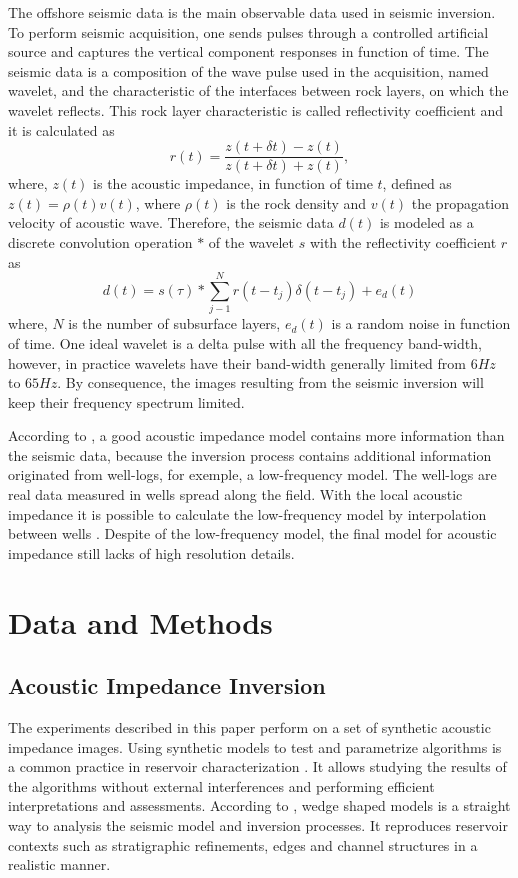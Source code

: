 \documentclass[conference,compsoc]{IEEEtran}
\begin{document}
The offshore seismic data is the main observable data used in seismic inversion. To perform seismic acquisition,
one sends pulses through a controlled artificial source and captures
the vertical component responses in function of time. The seismic data is a composition of
the wave pulse used in the acquisition, named wavelet, and the characteristic of the interfaces between rock layers,
on which the wavelet reflects. This rock layer characteristic is called reflectivity coefficient and it is
calculated as
\begin{equation}
r(t) = \frac{z(t+\delta t)-z(t)}{z(t+\delta t)+z(t)},
\label{eq:refletv}
\end{equation}
where, $z(t)$ is the acoustic impedance, in function of time $t$, defined as 
$z(t)=\rho(t)v(t)$, where $\rho(t)$ is the rock density and $v(t)$ the propagation velocity
of acoustic wave.
Therefore, the seismic data  $d(t)$ is modeled as a discrete convolution operation $*$ of the wavelet $s$ with the
reflectivity coefficient $r$ as
\begin{equation}
d(t) = s(\tau) * \sum_{j-1}^{N}{r(t- t_j) \delta(t - t_j) + e_d(t)}
\end{equation}
where, $N$ is the number of subsurface layers, $e_d(t)$ is a random noise in function of time.
One ideal wavelet is a delta pulse with all the frequency band-width, however, in practice
wavelets have their band-width generally limited from $6Hz$ to $65Hz$. By consequence,
the images resulting from the seismic inversion will keep their frequency spectrum limited.

According to \cite{Latimer}, a good acoustic impedance model contains more information
than the seismic data, because the inversion process contains additional information originated from well-logs, for
exemple, a low-frequency model.
The well-logs are real data measured in wells spread along the field.
With the local acoustic impedance it is possible to calculate the low-frequency
model by interpolation between wells \cite{Buland2003,Figueiredo2012}. Despite of the
low-frequency model, the final model for acoustic impedance still lacks of high resolution details.

\section{Data and Methods}
\subsection{Acoustic Impedance Inversion}
The experiments described in this paper perform
on a set of synthetic acoustic impedance images. Using synthetic models
to test and parametrize algorithms is a common practice in reservoir characterization \cite{sergio}. It allows studying the
results of the algorithms without external interferences and performing efficient interpretations and assessments. 
According to \cite{Harvey}, wedge shaped models is a straight way to analysis the
seismic model and inversion processes. It reproduces
reservoir contexts such as stratigraphic refinements, edges and channel structures in a realistic manner.
\end{document}
